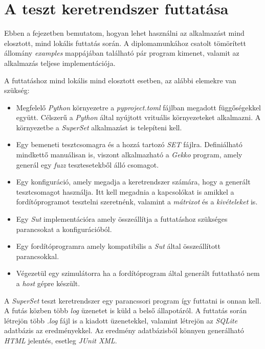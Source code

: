 \chapter{A teszt keretrendszer futtatása}

Ebben a fejezetben bemutatom, hogyan lehet használni az alkalmazást mind elosztott, mind lokális futtatás során. A
diplomamunkához csatolt tömörített állomány \textit{examples} mappájában található pár program kimenet, valamit az
alkalmazás teljese implementációja.

A futtatáshoz mind lokális mind elosztott esetben, az alábbi elemekre van szükség:

\begin{itemize}
    \item Megfelelő \textit{Python} környezetre a \textit{pyproject.toml} fájlban megadott függőségekkel együtt.
          Célszerű a \textit{Python} által nyújtott vrituális környezeteket alkalmazni. A környezetbe a
          \textit{SuperSet} alkalmazást is telepíteni kell.
    \item Egy bemeneti tesztcsomagra és a hozzá tartozó \textit{SET} fájlra. Definiálható mindkettő manuálisan is,
          viszont alkalmazható a \textit{Gekko} program, amely generál egy \textit{fuzz} tesztesetekből álló csomagot.
    \item Egy konfiguráció, amely megadja a keretrendszer számára, hogy a generált tesztcsomagot használja. Itt kell
          megadnia a kapcsolókat is amikkel a fordítóprogramot tesztelni szeretnénk, valamint a \emph{mátrixot} és a
          \emph{kivételeket} is.
    \item Egy \textit{Sut} implementációra amely összeállítja a futtatáshoz szükséges parancsokat a konfigurációból.
    \item Egy fordítóprogramra amely kompatibilis a \textit{Sut} által összeállított parancsokkal.
    \item Végezetül egy szimulátorra ha a fordítóprogram által generált futtatható nem a \textit{host} gépre készült.
\end{itemize}

A \textit{SuperSet} teszt keretrendszer egy parancssori program így futtatni is onnan kell. A futás közben több
\textit{log} üzenetet is küld a belső állapotáról. A futtatás során létrejön több \textit{.log} fájl is a kiadott
üzenetekkel, valamint létrejön az \textit{SQLite} adatbázis az eredményekkel. Az eredmény adatbázisból könnyen
generálható \textit{HTML} jelentés, esetleg \textit{JUnit XML}.


